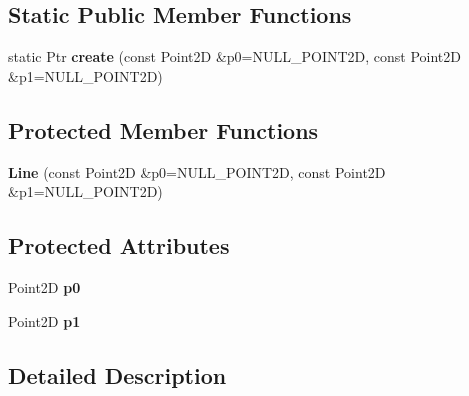 \subsection*{Static Public Member Functions}
\begin{DoxyCompactItemize}
\item 
\hypertarget{classsambag_1_1disco_1_1graphic_elements_1_1_line_a52321b2dbce8b58b4ad8bcb27a8a646e}{
static Ptr {\bfseries create} (const Point2D \&p0=NULL\_\-POINT2D, const Point2D \&p1=NULL\_\-POINT2D)}
\label{classsambag_1_1disco_1_1graphic_elements_1_1_line_a52321b2dbce8b58b4ad8bcb27a8a646e}

\end{DoxyCompactItemize}
\subsection*{Protected Member Functions}
\begin{DoxyCompactItemize}
\item 
\hypertarget{classsambag_1_1disco_1_1graphic_elements_1_1_line_a3b7d18298aa7c0e62904f8d468dbbbab}{
{\bfseries Line} (const Point2D \&p0=NULL\_\-POINT2D, const Point2D \&p1=NULL\_\-POINT2D)}
\label{classsambag_1_1disco_1_1graphic_elements_1_1_line_a3b7d18298aa7c0e62904f8d468dbbbab}

\end{DoxyCompactItemize}
\subsection*{Protected Attributes}
\begin{DoxyCompactItemize}
\item 
\hypertarget{classsambag_1_1disco_1_1graphic_elements_1_1_line_a2abb8091dcc27381c0543c0fd094b6ff}{
Point2D {\bfseries p0}}
\label{classsambag_1_1disco_1_1graphic_elements_1_1_line_a2abb8091dcc27381c0543c0fd094b6ff}

\item 
\hypertarget{classsambag_1_1disco_1_1graphic_elements_1_1_line_ab2c8d73e1dfe1d6a284c112e5e3abe7c}{
Point2D {\bfseries p1}}
\label{classsambag_1_1disco_1_1graphic_elements_1_1_line_ab2c8d73e1dfe1d6a284c112e5e3abe7c}

\end{DoxyCompactItemize}


\subsection{Detailed Description}


